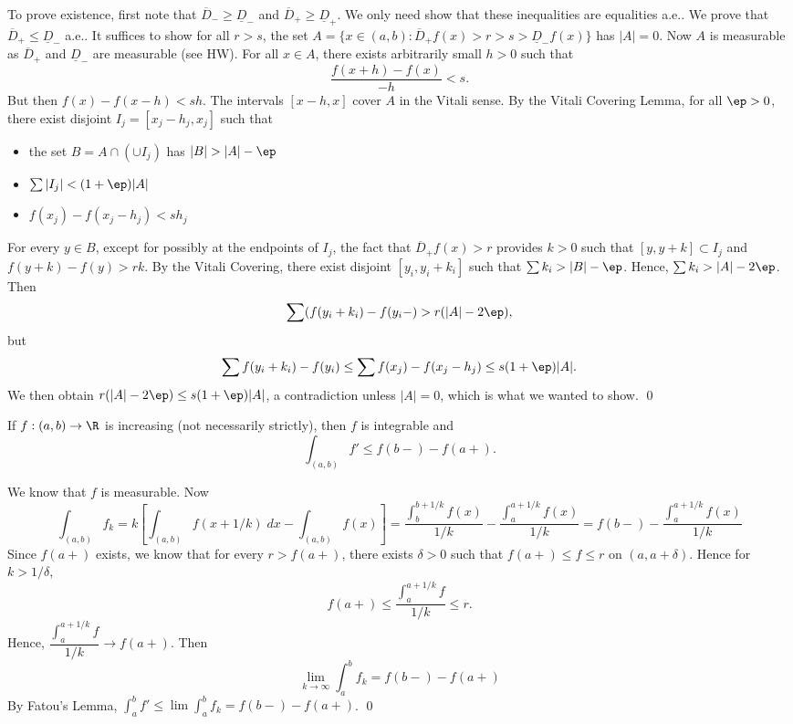 To prove existence, first note that $\overline{D}_{-} \geq \underline{D}_{-}$ and $\overline{D}_+ \geq \underline{D}_+$. We only need show that these inequalities are equalities a.e.. We prove that $\overline{D}_+ \leq \underline{D}_{-}$ a.e.. It suffices to show for all $r>s$, the set $A= \{ x \in (a,b) \colon \overline{D}_+ f(x) > r > s > \underline{D}_{-} f(x) \}$ has $|A|=0$. Now $A$ is measurable as $\overline{D}_+$ and $\underline{D}_{-}$ are measurable (see HW). For all $x \in A$, there exists arbitrarily small $h>0$ such that
	\[
	\dfrac{f(x+h) - f(x)}{-h} < s.
	\]
But then $f(x) - f(x-h) < sh$. The intervals $[x-h,x]$ cover $A$ in the Vitali sense. By the Vitali Covering Lemma, for all $\ep>0$, there exist disjoint $I_j= [x_j-h_j,x_j]$ such that 
	\begin{itemize}
	\item the set $B= A \cap (\cup I_j)$ has $|B|>|A|-\ep$
	\item $\sum |I_j| < (1+\ep)|A|$
	\item $f(x_j) - f(x_j-h_j)< sh_j$
	\end{itemize}
For every $y \in B$, except for possibly at the endpoints of $I_j$, the fact that $\overline{D}_+ f(x)>r$ provides $k>0$ such that $[y, y+k] \subset I_j$ and $f(y+k) - f(y) > rk$. By the Vitali Covering, there exist disjoint $[y_i,y_i+k_i]$ such that $\sum k_i > |B|- \ep$. Hence, $\sum k_i > |A| - 2\ep$. Then
	\[
	\sum (f(y_i + k_i) - f(y_i-)> r (|A|-2\ep),
	\]
but
	\[
	\sum f(y_i+k_i) - f(y_i) \leq \sum f(x_j) - f(x_j-h_j) \leq s (1+\ep) |A|.
	\]
We then obtain $r(|A|-2\ep) \leq s(1+\ep)|A|$, a contradiction unless $|A|=0$, which is what we wanted to show. \qed \\




\begin{cor}
If $f: (a,b) \to \R$ is increasing (not necessarily strictly), then $f$ is integrable and
	\[
	\int_{(a,b)} f' \leq f(b-) - f(a+).
	\]
\end{cor}

\pf We know that $f$ is measurable. Now
	\[
	\int_{(a,b)} f_k = k \left[ \int_{(a,b)} f(x+1/k) \; dx - \int_{(a,b)} f(x) \right] = \dfrac{\int_b^{b+1/k} f(x)}{1/k} - \dfrac{\int_a^{a+1/k} f(x)}{1/k}= f(b-) - \dfrac{\int_a^{a+1/k} f(x)}{1/k}
	\]
Since $f(a+)$ exists, we know that for every $r>f(a+)$, there exists $\delta>0$ such that $f(a+) \leq f \leq r$ on $(a,a+\delta)$. Hence for $k>1/\delta$,
	\[
	f(a+) \leq \dfrac{\int_a^{a+1/k} f}{1/k} \leq r.
	\]
Hence, $\dfrac{\int_a^{a+1/k} f}{1/k} \to f(a+)$. Then 
	\[
	\lim_{k \to \infty} \int_a^b f_k = f(b-) - f(a+)
	\]
By Fatou's Lemma, $\int_a^b f' \leq \lim \int_a^b f_k = f(b-) - f(a+)$. \qed \\


